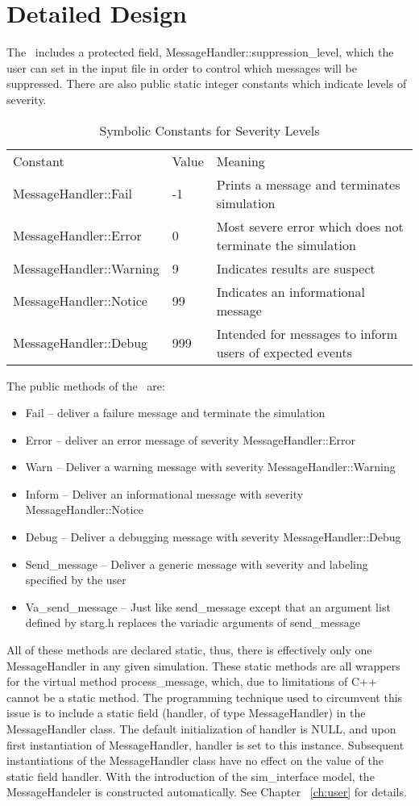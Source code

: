\section{Detailed Design}
The \MessageHandlerDesc\ includes a protected field,
MessageHandler::suppression\_level, which 
the user can set in the input file in order to control which messages will be suppressed.  There are also public static integer constants 
which indicate levels of severity.
\begin{table}
\begin{tabular}{lll}
Constant & Value & Meaning \\
MessageHandler::Fail & -1 & Prints a message and terminates simulation \\
MessageHandler::Error & 0 & Most severe error which does not terminate the simulation \\
MessageHandler::Warning & 9 & Indicates results are suspect \\
MessageHandler::Notice & 99 & Indicates an informational message \\
MessageHandler::Debug & 999 & Intended for messages to inform users of expected events
\end{tabular}
\caption{Symbolic Constants for Severity Levels}
\end{table}
\newpage
The public methods of the \MessageHandlerDesc\ are:
\begin{itemize}
\item Fail -- deliver a failure message and terminate the simulation
\item Error -- deliver an error message of severity MessageHandler::Error
\item Warn -- Deliver a warning message with severity MessageHandler::Warning
\item Inform -- Deliver an informational message with severity MessageHandler::Notice
\item Debug -- Deliver a debugging message with severity MessageHandler::Debug
\item Send\_message -- Deliver a generic message with severity
and labeling specified by the user
\item Va\_send\_message -- Just like send\_message except that an argument
list defined by starg.h replaces the variadic arguments of send\_message
\end{itemize}
All of these methods are declared static, thus, there is effectively
only one MessageHandler in any given simulation.  These static methods
are all wrappers for the virtual method process\_message, which, due
to limitations of C++ cannot be a static method.  
The programming technique used to circumvent this issue is to include
a static field (handler, of type MessageHandler) in the MessageHandler
class.  The default initialization of handler is NULL, and upon first
instantiation of MessageHandler, handler is set to this instance.
Subsequent instantiations of the MessageHandler class have no effect on the value of the 
static field handler.
With the introduction of the 
sim\_interface model, the MessageHandeler is constructed automatically.  
See Chapter ~\ref{ch:user} for details.

